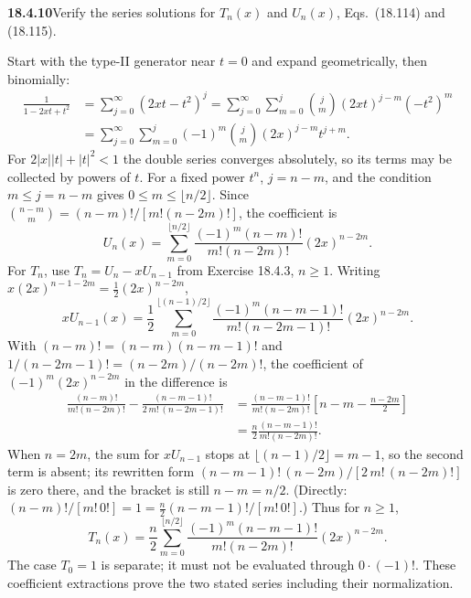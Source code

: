 \par\bigskip
\noindent\textbf{18.4.10}\quad Verify the series solutions for
$T_{n}(x)$ and $U_{n}(x)$, Eqs.~(18.114) and (18.115).
\solution
{}\par

Start with the type-II generator near $t=0$ and expand geometrically,
then binomially:
\begin{align*}
\frac1{1-2xt+t^2}
 &=\sum_{j=0}^\infty(2xt-t^2)^j
  =\sum_{j=0}^\infty\sum_{m=0}^j\binom jm(2xt)^{j-m}(-t^2)^m\\
 &=\sum_{j=0}^\infty\sum_{m=0}^j
       (-1)^m\binom jm(2x)^{j-m}t^{j+m}.
\end{align*}
For $2|x||t|+|t|^2<1$ the double series converges absolutely, so its
terms may be collected by powers of $t$.
For a fixed power $t^n$, $j=n-m$, and the condition $m\le j=n-m$
gives $0\le m\le\lfloor n/2\rfloor$.  Since
$\binom{n-m}m=(n-m)!/[m!(n-2m)!]$, the coefficient is
\[
\boxed{U_n(x)=\sum_{m=0}^{\lfloor n/2\rfloor}
 \frac{(-1)^m(n-m)!}{m!(n-2m)!}(2x)^{n-2m}}.
\]
For $T_n$, use $T_n=U_n-xU_{n-1}$ from Exercise 18.4.3, $n\ge1$.
Writing $x(2x)^{n-1-2m}=\frac12(2x)^{n-2m}$,
\[
xU_{n-1}(x)=\frac12\sum_{m=0}^{\lfloor(n-1)/2\rfloor}
 \frac{(-1)^m(n-m-1)!}{m!(n-2m-1)!}(2x)^{n-2m}.
\]
With $(n-m)!=(n-m)(n-m-1)!$ and $1/(n-2m-1)!=(n-2m)/(n-2m)!$,
the coefficient of $(-1)^m(2x)^{n-2m}$ in the difference is
\begin{align*}
\frac{(n-m)!}{m!(n-2m)!}
 -\frac{(n-m-1)!}{2\,m!\,(n-2m-1)!}
 &=\frac{(n-m-1)!}{m!(n-2m)!}
    \left[n-m-\frac{n-2m}{2}\right]\\
 &=\frac n2\frac{(n-m-1)!}{m!(n-2m)!}.
\end{align*}
When $n=2m$, the sum for $xU_{n-1}$ stops at $\lfloor(n-1)/2\rfloor=m-1$,
so the second term is absent; its rewritten form
$(n-m-1)!\,(n-2m)/[2\,m!\,(n-2m)!]$ is zero there, and the bracket is
still $n-m=n/2$.  (Directly: $(n-m)!/[m!\,0!]=1=\frac n2(n-m-1)!/[m!\,0!]$.)
Thus for $n\ge1$,
\[
\boxed{T_n(x)=\frac n2\sum_{m=0}^{\lfloor n/2\rfloor}
 \frac{(-1)^m(n-m-1)!}{m!(n-2m)!}(2x)^{n-2m}}.
\]
The case $T_0=1$ is separate; it must not be evaluated through
$0\cdot(-1)!$.  These coefficient extractions prove the two stated
series including their normalization.

